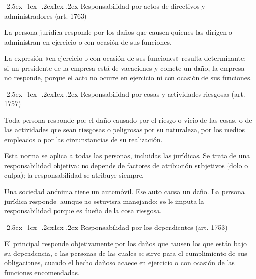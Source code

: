 \documentclass[12pt,oneside]{book}
\makeatletter
\renewcommand\subsection{\@startsection{subsection}{2}{\z@}%
  {-2.5ex \@plus -1ex \@minus -.2ex}{1ex \@plus .2ex}%
  {\normalfont\normalsize\bfseries}}
\makeatother
\begin{document}
\subsection{Responsabilidad por actos de directivos y administradores (art. 1763)}

\begin{regla}
La persona jurídica responde por los daños que causen quienes las dirigen o administran en ejercicio o con ocasión de sus funciones.
\end{regla}

La expresión «en ejercicio o con ocasión de sus funciones» resulta determinante: si un presidente de la empresa está de vacaciones y comete un daño, la empresa no responde, porque el acto no ocurre en ejercicio ni con ocasión de sus funciones.

\subsection{Responsabilidad por cosas y actividades riesgosas (art. 1757)}

\begin{regla}
Toda persona responde por el daño causado por el riesgo o vicio de las cosas, o de las actividades que sean riesgosas o peligrosas por su naturaleza, por los medios empleados o por las circunstancias de su realización.
\end{regla}

Esta norma se aplica a todas las personas, incluidas las jurídicas. Se trata de una responsabilidad objetiva: no depende de factores de atribución subjetivos (dolo o culpa); la responsabilidad se atribuye siempre.

\begin{ejemplo}
Una sociedad anónima tiene un automóvil. Ese auto causa un daño. La persona jurídica responde, aunque no estuviera manejando: se le imputa la responsabilidad porque es dueña de la cosa riesgosa.
\end{ejemplo}

\subsection{Responsabilidad por los dependientes (art. 1753)}

\begin{regla}
El principal responde objetivamente por los daños que causen los que están bajo su dependencia, o las personas de las cuales se sirve para el cumplimiento de sus obligaciones, cuando el hecho dañoso acaece en ejercicio o con ocasión de las funciones encomendadas.
\end{regla}
\end{document}
